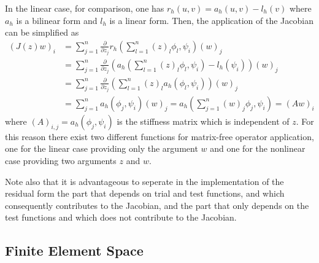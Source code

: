\documentclass[a4paper,12pt]{article}
\begin{document}
In the linear case, for comparison, one has $r_h(u,v) = a_h(u,v) - l_h(v)$ where
$a_h$ is a bilinear form and $l_h$ is a linear form. Then, the application
of the Jacobian can be simplified as
\begin{equation*}
\begin{split}
(J(z) w)_i &= \sum_{j=1}^n 
\frac{\partial}{\partial z_j} r_h\left(\sum_{l=1}^n (z)_l  \phi_l,\psi_i\right) (w)_j \\
&= \sum_{j=1}^n \frac{\partial}{\partial z_j} \left( 
a_h\left(\sum_{l=1}^n (z)_l  \phi_l,\psi_i\right) - l_h(\psi_i)\right) (w)_j \\
&= \sum_{j=1}^n \frac{\partial}{\partial z_j} \left( 
\sum_{l=1}^n (z)_l a_h(\phi_l,\psi_i) \right)  (w)_j \\
&= \sum_{j=1}^n a_h(\phi_j,\psi_i) (w)_j =
a_h\left( \sum_{j=1}^n (w)_j \phi_j,\psi_i\right) =
(A w)_i 
\end{split}
\end{equation*}
where $(A)_{i,j} = a_h(\phi_j,\psi_i)$ is the stiffness matrix which is independent of $z$.
For this reason there exist two different functions for matrix-free operator application,
one for the linear case providing only the argument $w$ and one for the nonlinear
case providing two arguments $z$ and $w$. 

Note also that it is advantageous to seperate in the
implementation of the residual form the part that depends on trial and test functions,
and which consequently contributes to the Jacobian, and the part that only depends
on the test functions and which does not contribute to the Jacobian.

\subsection{Finite Element Space}
\end{document}
